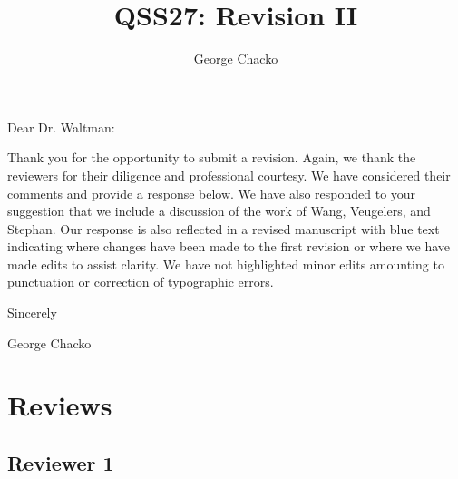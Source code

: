 \documentclass[11pt, oneside]{article}   	%
\title{QSS27: Revision II}
\author{George Chacko}
\begin{document}
\maketitle

Dear Dr. Waltman:

\vspace{5mm}
\raggedright 
Thank you for the opportunity to submit a revision. Again, we thank the reviewers for their diligence and professional courtesy. We have considered their comments and provide a response below. We have also responded to your suggestion that we include a discussion of the work of Wang, Veugelers, and Stephan. Our response is also reflected in a revised manuscript with blue text indicating where changes have been made to the first revision or where we have made edits to assist clarity. We have not highlighted minor edits amounting to punctuation or correction of typographic errors. 

\vspace{3mm}
Sincerely
\vspace{5mm}

George Chacko

\section{Reviews}
\subsection{Reviewer 1}
\end{document}
